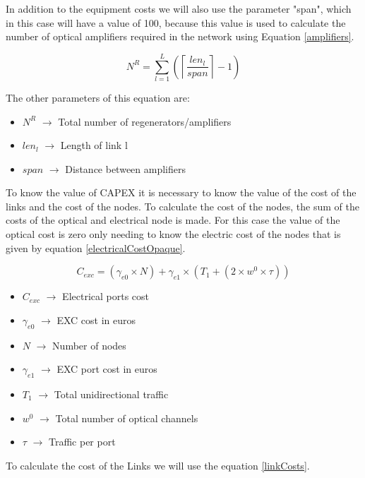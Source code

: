 In addition to the equipment costs we will also use the parameter "span", which in this case will have a value of 100, because this value is used to calculate the number of optical amplifiers required in the network using Equation \ref{amplifiers}.

\begin{equation}
N^R = \sum\limits_{l=1}^L\left(\left\lceil\frac{len_l}{span}\right\rceil-1\right)
\label{amplifiers}
\end{equation}

The other parameters of this equation are:
\begin{itemize}
\item{$N^R$			$\rightarrow$ Total number of regenerators/amplifiers}
\item{$len_l$		$\rightarrow$ Length of link l}
\item{$span$		$\rightarrow$ Distance between amplifiers}	
\end{itemize}	

To know the value of CAPEX it is necessary to know the value of the cost of the links and the cost of the nodes.
To calculate the cost of the nodes, the sum of the costs of the optical and electrical node is made. For this case the value of the optical cost is zero only needing to know the electric cost of the nodes that is given by equation \ref{electricalCostOpaque}.

\begin{equation}
C_{exc} = \left(\gamma_{e0}\times N\right) + \gamma_{e1} \times \left(T_1 + \left(2 \times w^0 \times \tau \right)\right)
\label{electricalCostOpaque}
\end{equation}

\begin{itemize}
\item{$C_{exc}$		$\rightarrow$	Electrical ports cost}
\item{$\gamma_{e0}$	$\rightarrow$	EXC cost in euros}
\item{$N$			$\rightarrow$	Number of nodes}
\item{$\gamma_{e1}$	$\rightarrow$	EXC port cost in euros}
\item{$T_1$         $\rightarrow$   Total unidirectional traffic}
\item{$w^0$			$\rightarrow$	Total number of optical channels}
\item{$\tau$		$\rightarrow$	Traffic per port}
\end{itemize}

To calculate the cost of the Links we will use the equation \ref{linkCosts}.

